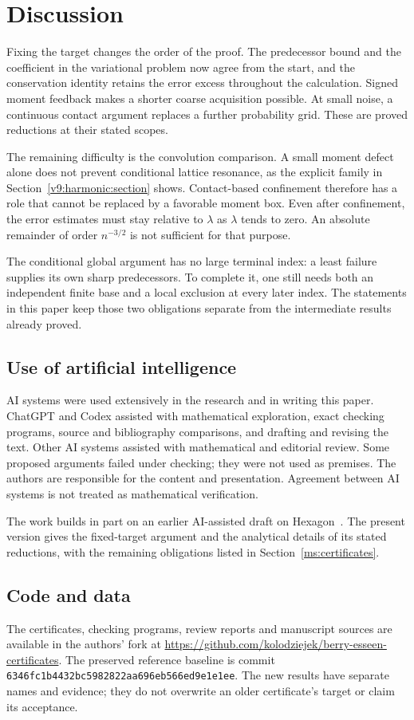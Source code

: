 \section{Discussion}\label{ms:discussion}

Fixing the target changes the order of the proof. The predecessor bound
and the coefficient in the variational problem now agree from the start,
and the conservation identity retains the error excess throughout the
calculation. Signed moment feedback makes a shorter coarse acquisition
possible. At small noise, a continuous contact argument replaces a further
probability grid. These are proved reductions at their stated scopes.

The remaining difficulty is the convolution comparison. A small moment
defect alone does not prevent conditional lattice resonance, as the
explicit family in Section~\ref{v9:harmonic:section} shows. Contact-based
confinement therefore has a role that cannot be replaced by a favorable
moment box. Even after confinement, the error estimates must stay relative
to $\lambda$ as $\lambda$ tends to zero. An absolute remainder of order
$n^{-3/2}$ is not sufficient for that purpose.

The conditional global argument has no large terminal index: a least
failure supplies its own sharp predecessors. To complete it, one still
needs both an independent finite base and a local exclusion at every
later index. The statements in this paper keep those two obligations
separate from the intermediate results already proved.

\subsection*{Use of artificial intelligence}

AI systems were used extensively in the research and in writing this
paper. ChatGPT and Codex assisted with mathematical exploration, exact
checking programs, source and bibliography comparisons, and drafting and
revising the text. Other AI systems assisted with mathematical and
editorial review. Some proposed arguments failed under checking; they
were not used as premises. The authors are responsible for the content
and presentation. Agreement between AI systems is not treated as
mathematical verification.

The work builds in part on an earlier AI-assisted draft on
Hexagon~\cite{rodziewiczkolodziejek2026momentdefects}. The present version
gives the fixed-target argument and the analytical details of its stated
reductions, with the remaining obligations listed in
Section~\ref{ms:certificates}.

\subsection*{Code and data}

The certificates, checking programs, review reports and manuscript sources
are available in the authors' fork at
\url{https://github.com/kolodziejek/berry-esseen-certificates}.
The preserved reference baseline is commit
\texttt{6346fc1b4432bc5982822aa696eb566ed9e1e1ee}.
The new results have separate names and evidence; they do not overwrite
an older certificate's target or claim its acceptance.
